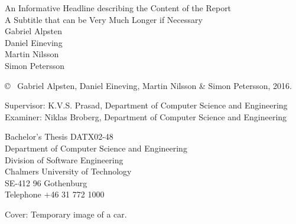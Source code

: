 \newpage
\thispagestyle{plain}
\vspace*{4.5cm}
An Informative Headline describing the Content of the Report\\
A Subtitle that can be Very Much Longer if Necessary\\
{\large Gabriel Alpsten}\\
{\large Daniel Eineving}\\
{\large Martin Nilsson}\\
{\large Simon Petersson}

\copyright ~ Gabriel Alpsten, Daniel Eineving, Martin Nilsson \& Simon Petersson, 2016. \setlength{\parskip}{1cm}

Supervisor: K.V.S. Prasad, Department of Computer Science and Engineering\\
Examiner: Niklas Broberg, Department of Computer Science and Engineering \setlength{\parskip}{1cm}

Bachelor's Thesis DATX02-48 \\
Department of Computer Science and Engineering\\
Division of Software Engineering\\
Chalmers University of Technology\\
SE-412 96 Gothenburg\\
Telephone +46 31 772 1000 \setlength{\parskip}{0.5cm}

\vfill
Cover: Temporary image of a car. \setlength{\parskip}{0.5cm}


